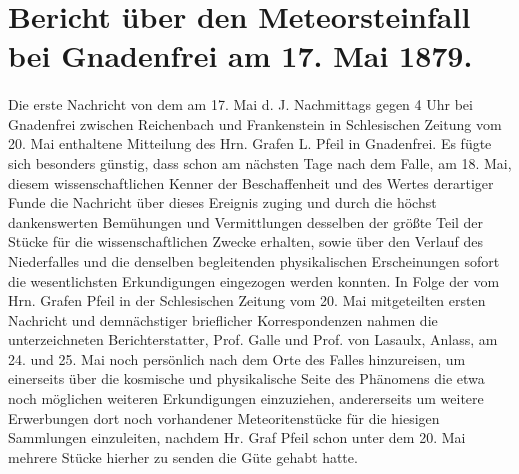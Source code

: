 \documentclass[a4paper, 11pt, oneside]{article}
\begin{document}
\section{Bericht über den Meteorsteinfall bei Gnadenfrei am 17. Mai 1879.}
\paragraph{}
Die erste Nachricht von dem am 17. Mai d. J. Nachmittags gegen 4 Uhr bei Gnadenfrei zwischen Reichenbach und Frankenstein in Schlesischen Zeitung vom 20. Mai enthaltene Mitteilung des Hrn. Grafen L. Pfeil in Gnadenfrei. Es fügte sich besonders günstig, dass schon am nächsten Tage nach dem Falle, am 18. Mai, diesem wissenschaftlichen Kenner der Beschaffenheit und des Wertes derartiger Funde die Nachricht über dieses Ereignis zuging und durch die höchst dankenswerten Bemühungen und Vermittlungen desselben der größte Teil der Stücke für die wissenschaftlichen Zwecke erhalten, sowie über den Verlauf des Niederfalles und die denselben begleitenden physikalischen Erscheinungen sofort die wesentlichsten Erkundigungen eingezogen werden konnten. In Folge der vom Hrn. Grafen Pfeil in der Schlesischen Zeitung vom 20. Mai mitgeteilten ersten Nachricht und demnächstiger brieflicher Korrespondenzen nahmen die unterzeichneten Berichterstatter, Prof. Galle und Prof. von Lasaulx, Anlass, am 24. und 25. Mai noch persönlich nach dem Orte des Falles hinzureisen, um einerseits über die kosmische und physikalische Seite des Phänomens die etwa noch möglichen weiteren Erkundigungen einzuziehen, andererseits um weitere Erwerbungen dort noch vorhandener Meteoritenstücke für die hiesigen Sammlungen einzuleiten, nachdem Hr. Graf Pfeil schon unter dem 20. Mai mehrere Stücke hierher zu senden die Güte gehabt hatte.
\end{document}
